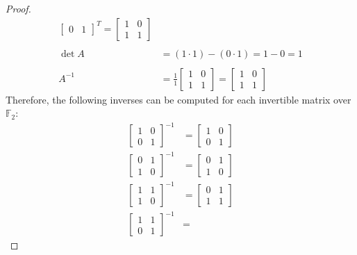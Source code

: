 \documentclass[12pt,reqno]{article}
\newcommand{\F}{\mathbb{F}}
\theoremstyle{definition}
\begin{document}
\begin{proof}
\begin{align*}
\begin{bmatrix}
            0 & 1
        \end{bmatrix}^T
        =
        \begin{bmatrix}
            1 & 0\\
            1 & 1
        \end{bmatrix}\\\\
        \det A &= (1 \cdot 1) - (0 \cdot 1) = 1 - 0 = 1\\\\
        A^{-1} &= \frac{1}{1}
        \begin{bmatrix}
            1 & 0\\
            1 & 1
        \end{bmatrix}
        =
        \begin{bmatrix}
            1 & 0\\
            1 & 1
        \end{bmatrix}
    \end{align*}
Therefore, the following inverses can be computed for each invertible matrix over $\F_2$:
\begin{align*}
    \begin{bmatrix}
        1 & 0\\
        0 & 1
    \end{bmatrix}^{-1} &=
    \begin{bmatrix}
        1 & 0\\
        0 & 1
    \end{bmatrix}\\
    \begin{bmatrix}
        0 & 1\\
        1 & 0
    \end{bmatrix}^{-1} &=
    \begin{bmatrix}
        0 & 1\\
        1 & 0
    \end{bmatrix}\\
    \begin{bmatrix}
        1 & 1\\
        1 & 0
    \end{bmatrix}^{-1} &= 
    \begin{bmatrix}
        0 & 1\\
        1 & 1
    \end{bmatrix}\\
    \begin{bmatrix}
        1 & 1\\
        0 & 1
    \end{bmatrix}^{-1} &= 

\end{align*}
\end{proof}
\end{document}
